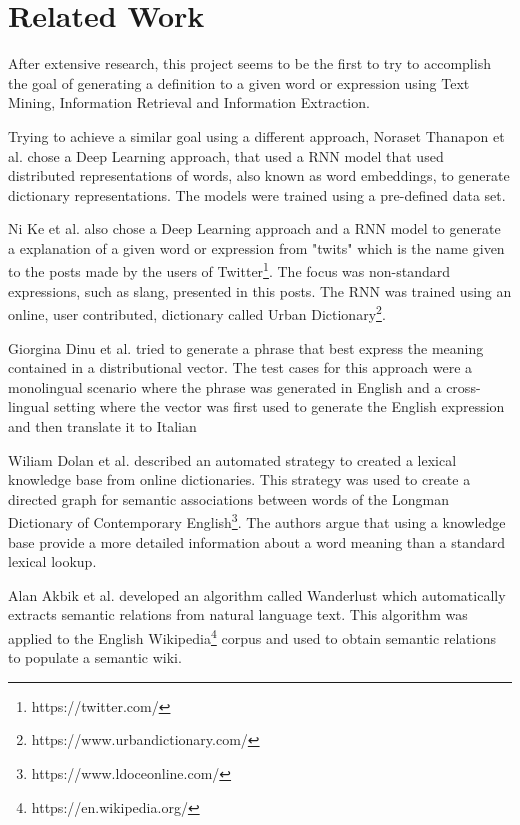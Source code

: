 \section{Related Work}

After extensive research, this project seems to be the first to try to accomplish the goal of generating a definition to a given word or expression using Text Mining, Information Retrieval and Information Extraction.

Trying to achieve a similar goal using a different approach, Noraset Thanapon et al.\cite{noraset2016definition} chose a Deep Learning approach, that used a \gls{RNN} model that used distributed representations of words, also known as word embeddings, to generate dictionary representations.
The models were trained using a pre-defined data set.

Ni Ke et al.\cite{ni2017learning} also chose a Deep Learning approach and a \gls{RNN} model to generate a explanation of a given word or expression from "twits" which is the name given to the posts made by the users of Twitter\footnote{https://twitter.com/}.
The focus was non-standard expressions, such as slang, presented in this posts.
The \gls{RNN} was trained using an online, user contributed, dictionary called Urban Dictionary\footnote{https://www.urbandictionary.com/}.

Giorgina Dinu et al.\cite{dinu2014make} tried to generate a phrase that best express the meaning contained in a distributional vector.
The test cases for this approach were a monolingual scenario where the phrase was generated in English and a cross-lingual setting where the vector was first used to generate the English expression and then translate it to Italian

Wiliam Dolan et al.\cite{dolan1993automatically} described an automated strategy to created a lexical knowledge base from online dictionaries.
This strategy was used to create a directed graph for semantic associations between words of the Longman Dictionary of Contemporary English\footnote{https://www.ldoceonline.com/}.
The authors argue that using a knowledge base provide a more detailed information about a word meaning than a standard lexical lookup.

Alan Akbik et al.\cite{akbik2009wanderlusl} developed an algorithm called Wanderlust which automatically extracts semantic relations from natural language text.
This algorithm was applied to the English Wikipedia\footnote{https://en.wikipedia.org/} corpus and used to obtain semantic relations to populate a semantic wiki.

